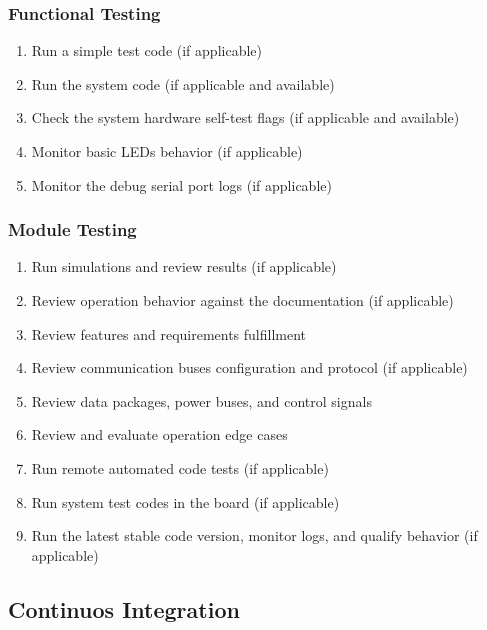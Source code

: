 \subsubsection{Functional Testing}
\begin{enumerate} \setlength\itemsep{-0.3em}
    \item Run a simple test code (if applicable) 
    \item Run the system code (if applicable and available) 
    \item Check the system hardware self-test flags (if applicable and available) 
    \item Monitor basic LEDs behavior (if applicable) 
    \item Monitor the debug serial port logs (if applicable)
\end{enumerate}

\subsubsection{Module Testing}
\begin{enumerate} \setlength\itemsep{-0.3em}
    \item Run simulations and review results (if applicable)
    \item Review operation behavior against the documentation (if applicable)
    \item Review features and requirements fulfillment
    \item Review communication buses configuration and protocol (if applicable)
    \item Review data packages, power buses, and control signals
    \item Review and evaluate operation edge cases
    \item Run remote automated code tests (if applicable)
    \item Run system test codes in the board (if applicable)
    \item Run the latest stable code version, monitor logs, and qualify behavior (if applicable)
\end{enumerate}

\subsection{Continuos Integration}

